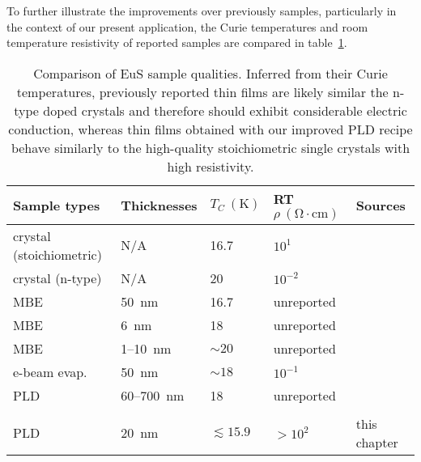 To further illustrate the improvements over previously samples, particularly in the context of our present application, the Curie temperatures and room temperature resistivity of reported samples are compared in table~\ref{tab:EuS_comparison}.%
%
\begin{table}[ht]%
    \centering%
    \begin{tabularx}{1.0\columnwidth}[t]{l|l|l|l|X}
        \caption[Comparison of EuS sample qualities]{\label{tab:EuS_comparison}Comparison of EuS sample qualities. Inferred from their Curie temperatures, previously reported thin films are likely similar the n-type doped crystals and therefore should exhibit considerable electric conduction, whereas thin films obtained with our improved PLD recipe behave similarly to the high-quality stoichiometric single crystals with high resistivity.}\\
        \hline\hline
        Sample types & Thicknesses & $T_C~\mathrm{(K)}$ & RT $\rho~\mathrm{(\Omega\cdot{}cm)}$ & Sources\\
        \hline
        crystal (stoichiometric) & N/A & 16.7 & $10^1$ & \citeauthor{EuS_Shafer}~\citeyear{EuS_Shafer}~\cite{EuS_Shafer}\\
        \hline
        crystal (n-type) & N/A & 20 & $10^{-2}$ & \citeauthor{EuS_ntype}~\citeyear{EuS_ntype}~\cite{EuS_ntype}\\
        \hline
        MBE & 50~nm & 16.7 & unreported & \citeauthor{EuS_MBE_Dauth}~\citeyear{EuS_MBE_Dauth}~\cite{EuS_MBE_Dauth}\\
        \hline
        MBE & 6~nm & 18 & unreported & \citeauthor{EuS_MBE_Muller}~\citeyear{EuS_MBE_Muller}~\cite{EuS_MBE_Muller}\\
        \hline
        MBE & 1--10~nm & $\sim20$ & unreported & \citeauthor{Moodera2013}~\citeyear{Moodera2013}~\cite{Moodera2013}\\
        \hline
        e-beam evap. & 50~nm & $\sim18$ & $10^{-1}$ & \citeauthor{EuS_thin_film_Keller}~\citeyear{EuS_thin_film_Keller}~\cite{EuS_thin_film_Keller}\\
        \hline
        PLD & 60--700~nm & 18 & unreported & \citeauthor{EuS_PLD1}~\citeyear{EuS_PLD1}~\cite{EuS_PLD1}\\
        \hline
        \\
        \hline
        PLD & 20~nm & $\lesssim15.9$ & $>10^{2}$ & this chapter\\
        \hline\hline
    \end{tabularx}
\end{table} %
